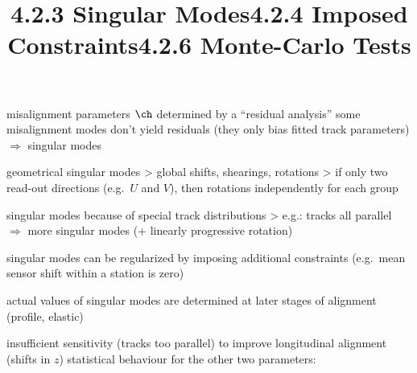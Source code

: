 \newpage%
\title{4.2.3 Singular Modes}
\vskip-3mm

\> misalignment parameters $\ch$ determined by a ``residual analysis''
\> some misalignment modes don't yield residuals (they only bias fitted track parameters)\\
	$\Rightarrow$ singular modes

\> geometrical singular modes
\>> global shifts, shearings, rotations
\>> if only two read-out directions (e.g.~$U$ and $V$), then rotations independently for each group

\> singular modes because of special track distributions
\>> e.g.: tracks all parallel $\Rightarrow$ more singular modes (+ linearly progressive rotation)

{\SmallerFonts{}}

\vfil
\title{4.2.4 Imposed Constraints}
\vskip-3mm

\> singular modes can be regularized by imposing additional constraints (e.g.~mean sensor shift within a station is zero)

\> actual values of singular modes are determined at later stages of alignment (profile, elastic)

\newpage%
\title{4.2.6 Monte-Carlo Tests}

\> insufficient sensitivity (tracks too parallel) to improve longitudinal alignment (shifts in $z$)
\> statistical behaviour for the other two parameters:

